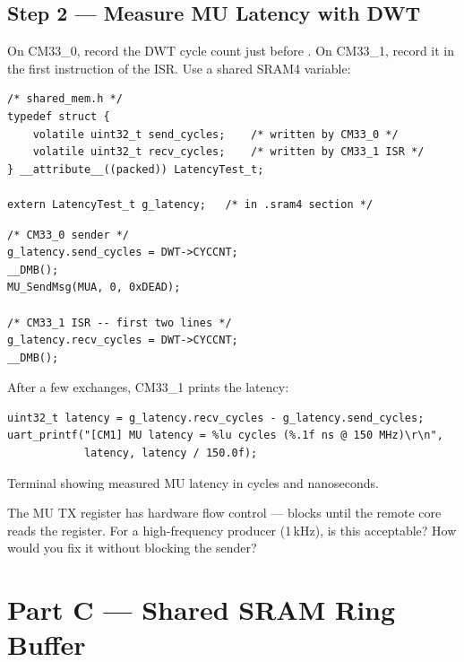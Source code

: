\documentclass[11pt, a4paper]{article}
\begin{document}
\subsection{Step 2 --- Measure MU Latency with DWT}

On CM33\_0, record the DWT cycle count just before . On CM33\_1,
record it in the first instruction of the ISR. Use a shared SRAM4 variable:

\begin{lstlisting}[style=cstyle]
/* shared_mem.h */
typedef struct {
    volatile uint32_t send_cycles;    /* written by CM33_0 */
    volatile uint32_t recv_cycles;    /* written by CM33_1 ISR */
} __attribute__((packed)) LatencyTest_t;

extern LatencyTest_t g_latency;   /* in .sram4 section */
\end{lstlisting}

\begin{lstlisting}[style=cstyle]
/* CM33_0 sender */
g_latency.send_cycles = DWT->CYCCNT;
__DMB();
MU_SendMsg(MUA, 0, 0xDEAD);

/* CM33_1 ISR -- first two lines */
g_latency.recv_cycles = DWT->CYCCNT;
__DMB();
\end{lstlisting}

After a few exchanges, CM33\_1 prints the latency:

\begin{lstlisting}[style=cstyle]
uint32_t latency = g_latency.recv_cycles - g_latency.send_cycles;
uart_printf("[CM1] MU latency = %lu cycles (%.1f ns @ 150 MHz)\r\n",
            latency, latency / 150.0f);
\end{lstlisting}

\begin{checkpointbox}[~B2]
  Terminal showing measured MU latency in cycles and nanoseconds.
\end{checkpointbox}

\begin{questionbox}[~B1]
  The MU TX register has hardware flow control ---  blocks until the
  remote core reads the register. For a high-frequency producer (1\,kHz), is this
  acceptable? How would you fix it without blocking the sender?
\end{questionbox}

\section{Part C --- Shared SRAM Ring Buffer}
\end{document}
